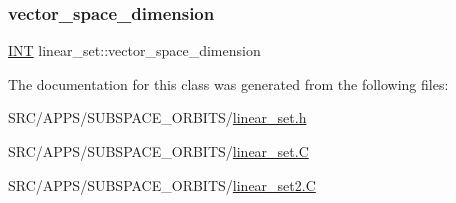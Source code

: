 \subsubsection{\texorpdfstring{vector\+\_\+space\+\_\+dimension}{vector\_space\_dimension}}
{\footnotesize\ttfamily \mbox{\hyperlink{galois_8h_a09fddde158a3a20bd2dcadb609de11dc}{I\+NT}} linear\+\_\+set\+::vector\+\_\+space\+\_\+dimension}



The documentation for this class was generated from the following files\+:\begin{DoxyCompactItemize}
\item 
S\+R\+C/\+A\+P\+P\+S/\+S\+U\+B\+S\+P\+A\+C\+E\+\_\+\+O\+R\+B\+I\+T\+S/\mbox{\hyperlink{linear__set_8h}{linear\+\_\+set.\+h}}\item 
S\+R\+C/\+A\+P\+P\+S/\+S\+U\+B\+S\+P\+A\+C\+E\+\_\+\+O\+R\+B\+I\+T\+S/\mbox{\hyperlink{linear__set_8_c}{linear\+\_\+set.\+C}}\item 
S\+R\+C/\+A\+P\+P\+S/\+S\+U\+B\+S\+P\+A\+C\+E\+\_\+\+O\+R\+B\+I\+T\+S/\mbox{\hyperlink{linear__set2_8_c}{linear\+\_\+set2.\+C}}\end{DoxyCompactItemize}
